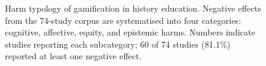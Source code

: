 \begin{figure}[!h]
{%
}%
\caption{Harm typology of gamification in history education. Negative effects from the 74-study corpus are systematised into four categories: cognitive, affective, equity, and epistemic harms. Numbers indicate studies reporting each subcategory; 60 of 74 studies (81.1\%) reported at least one negative effect.}
\label{fig:harm-typology}
\end{figure}
